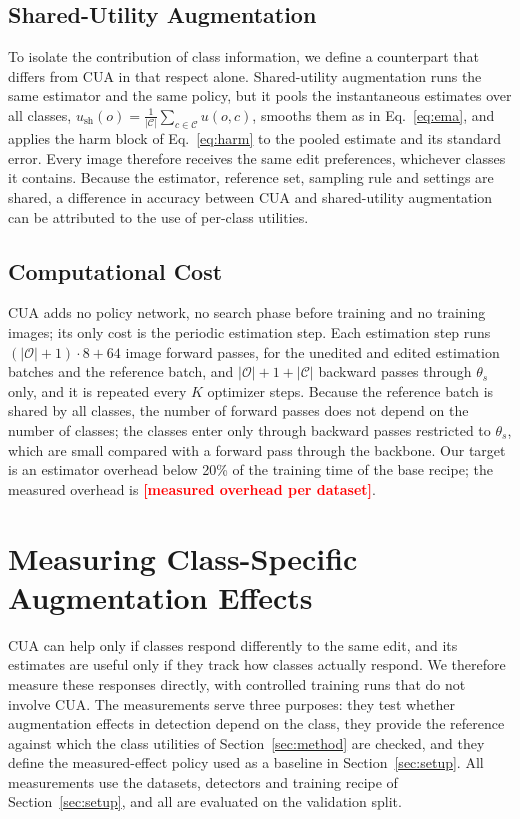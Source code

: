 \documentclass[conference]{IEEEtran}
\newcommand{\todo}[1]{\textcolor{red}{\textbf{[#1]}}}
\begin{document}
\subsection{Shared-Utility Augmentation}
\label{sec:method_shared}

To isolate the contribution of class information, we define a counterpart that differs from CUA in that respect alone. Shared-utility augmentation runs the same estimator and the same policy, but it pools the instantaneous estimates over all classes, $u_{\mathrm{sh}}(o)=\frac{1}{|\mathcal{C}|}\sum_{c\in\mathcal{C}}u(o,c)$, smooths them as in Eq.~\eqref{eq:ema}, and applies the harm block of Eq.~\eqref{eq:harm} to the pooled estimate and its standard error. Every image therefore receives the same edit preferences, whichever classes it contains. Because the estimator, reference set, sampling rule and settings are shared, a difference in accuracy between CUA and shared-utility augmentation can be attributed to the use of per-class utilities.

\subsection{Computational Cost}
\label{sec:method_cost}

CUA adds no policy network, no search phase before training and no training images; its only cost is the periodic estimation step. Each estimation step runs $(|\mathcal{O}|+1)\cdot 8+64$ image forward passes, for the unedited and edited estimation batches and the reference batch, and $|\mathcal{O}|+1+|\mathcal{C}|$ backward passes through $\theta_s$ only, and it is repeated every $K$ optimizer steps. Because the reference batch is shared by all classes, the number of forward passes does not depend on the number of classes; the classes enter only through backward passes restricted to $\theta_s$, which are small compared with a forward pass through the backbone. Our target is an estimator overhead below 20\% of the training time of the base recipe; the measured overhead is \todo{measured overhead per dataset}.

\section{Measuring Class-Specific Augmentation Effects}
\label{sec:measurement}

CUA can help only if classes respond differently to the same edit, and its estimates are useful only if they track how classes actually respond. We therefore measure these responses directly, with controlled training runs that do not involve CUA. The measurements serve three purposes: they test whether augmentation effects in detection depend on the class, they provide the reference against which the class utilities of Section~\ref{sec:method} are checked, and they define the measured-effect policy used as a baseline in Section~\ref{sec:setup}. All measurements use the datasets, detectors and training recipe of Section~\ref{sec:setup}, and all are evaluated on the validation split.
\end{document}
